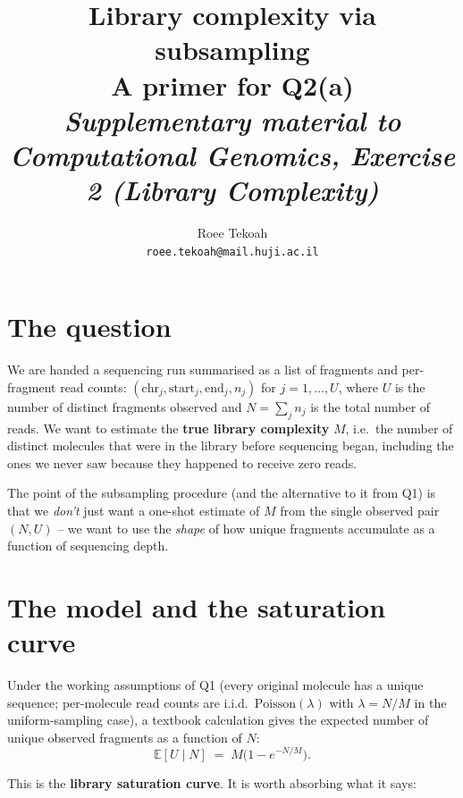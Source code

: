 \documentclass[11pt]{article}
\title{\vspace{-2em}\textbf{Library complexity via subsampling}\\[0.3em]\large
A primer for Q2(a)\\[0.6em]
\normalsize \textit{Supplementary material to Computational Genomics, Exercise 2 (Library Complexity)}}
\author{Roee Tekoah \\ \texttt{roee.tekoah@mail.huji.ac.il}}
\date{}
\newcommand{\E}{\mathbb{E}}
\begin{document}
\maketitle
\vspace{-1em}

\section{The question}

We are handed a sequencing run summarised as a list of fragments and per-fragment read
counts: $(\mathrm{chr}_j, \mathrm{start}_j, \mathrm{end}_j, n_j)$ for $j = 1, \dots, U$,
where $U$ is the number of distinct fragments observed and $N = \sum_j n_j$ is the total
number of reads. We want to estimate the \textbf{true library complexity} $M$, i.e.\ the
number of distinct molecules that were in the library before sequencing began, including
the ones we never saw because they happened to receive zero reads.

The point of the subsampling procedure (and the alternative to it from Q1) is that we
\emph{don't} just want a one-shot estimate of $M$ from the single observed pair $(N, U)$
-- we want to use the \emph{shape} of how unique fragments accumulate as a function of
sequencing depth.

\section{The model and the saturation curve}

Under the working assumptions of Q1 (every original molecule has a unique sequence;
per-molecule read counts are i.i.d.\ $\mathrm{Poisson}(\lambda)$ with $\lambda = N/M$
in the uniform-sampling case), a textbook calculation gives the expected number of
unique observed fragments as a function of $N$:
\begin{equation}
   \E[U \mid N] \;=\; M\bigl(1 - e^{-N/M}\bigr).
   \label{eq:saturation}
\end{equation}

This is the \textbf{library saturation curve}. It is worth absorbing what it says:
\end{document}
